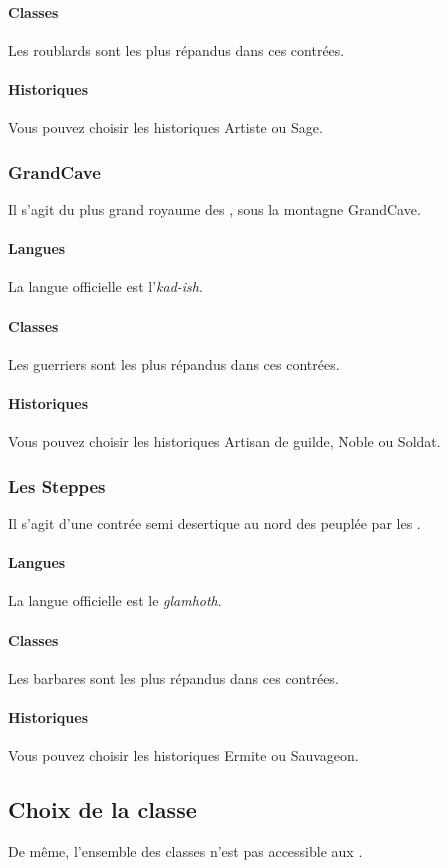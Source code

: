 \documentclass[a4paper,10pt,openany]{book}
\begin{document}
\begin{multicols}{2}
\paragraph{Classes}
Les roublards sont les plus répandus dans ces contrées.
\paragraph{Historiques}
Vous pouvez choisir les historiques Artiste ou Sage.

\subsubsection{GrandCave}
Il s’agit du plus grand royaume des \Nains, sous la montagne GrandCave.
\paragraph{Langues}
La langue officielle est l’\emph{kad-ish}.
\paragraph{Classes}
Les guerriers sont les plus répandus dans ces contrées.
\paragraph{Historiques}
Vous pouvez choisir les historiques Artisan de guilde, Noble ou Soldat.

\subsubsection{Les Steppes}
Il s’agit d’une contrée semi desertique au nord des \Royaumes peuplée par les \DemiOrcs.
\paragraph{Langues}
La langue officielle est le \emph{glamhoth}.
\paragraph{Classes}
Les barbares sont les plus répandus dans ces contrées.
\paragraph{Historiques}
Vous pouvez choisir les historiques Ermite ou Sauvageon.

\subsection{Choix de la classe}
De même, l’ensemble des classes n’est pas accessible aux \PJs.


\end{multicols}
\end{document}
